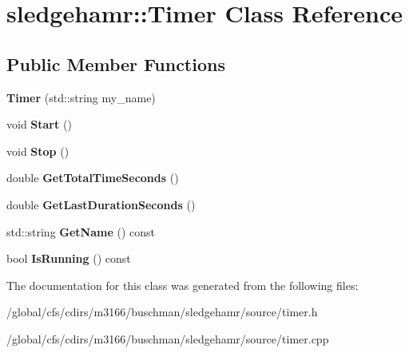 \hypertarget{classsledgehamr_1_1Timer}{}\section{sledgehamr\+:\+:Timer Class Reference}
\label{classsledgehamr_1_1Timer}
\subsection*{Public Member Functions}
\begin{DoxyCompactItemize}
\item 
\mbox{\label{classsledgehamr_1_1Timer_add5408527073192c7f6384336ba73146}} 
{\bfseries Timer} (std\+::string my\+\_\+name)
\item 
\mbox{\label{classsledgehamr_1_1Timer_a29cfaea8e9d7669f1b4cfc4cfc8e0fbb}} 
void {\bfseries Start} ()
\item 
\mbox{\label{classsledgehamr_1_1Timer_acb5940b4900781df6acaad4cdc42ba6c}} 
void {\bfseries Stop} ()
\item 
\mbox{\label{classsledgehamr_1_1Timer_a41597a39dce59fe6f58a5639fc69cc5b}} 
double {\bfseries Get\+Total\+Time\+Seconds} ()
\item 
\mbox{\label{classsledgehamr_1_1Timer_a25e1c5fa0585a3763b8dbc20be479f0d}} 
double {\bfseries Get\+Last\+Duration\+Seconds} ()
\item 
\mbox{\label{classsledgehamr_1_1Timer_a51bf2fa058461fd28d3c76b286df11e6}} 
std\+::string {\bfseries Get\+Name} () const
\item 
\mbox{\label{classsledgehamr_1_1Timer_a8aca03d4d3d7b72abb9b5c2c089e9b68}} 
bool {\bfseries Is\+Running} () const
\end{DoxyCompactItemize}


The documentation for this class was generated from the following files\+:\begin{DoxyCompactItemize}
\item 
/global/cfs/cdirs/m3166/buschman/sledgehamr/source/timer.\+h\item 
/global/cfs/cdirs/m3166/buschman/sledgehamr/source/timer.\+cpp\end{DoxyCompactItemize}
